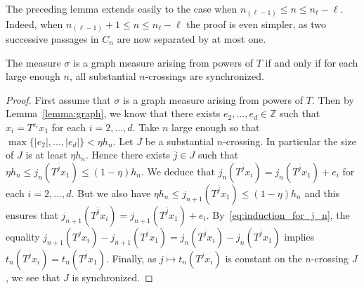 \documentclass[AHL,Unicode,longabstracts]{cedram}
\newcommand{\ZZ}{\mathbb{Z}}
\newcommand{\jb}{\overline{j}}
\begin{document}
\begin{rema}
The preceding lemma extends easily to the case when $n_{(\ell-1)}\le n\le n_\ell-\ell$. Indeed, when $n_{(\ell-1)}+1\le n\le n_\ell-\ell$ the proof is even simpler, as two successive passages in $C_n$ are now separated by at most one.
\end{rema}

\begin{prop}\label{prop:synchronized}
The measure $\sigma$ is a graph measure arising from powers of $T$ if and only if for each large enough $n$, all substantial $n$-crossings are synchronized.
\end{prop}

\begin{proof}
First assume that $\sigma$ is a graph measure arising from powers of $T$. Then by Lemma~\ref{lemma:graph}, we know that there exists $e_2,\ldots,e_d\in\ZZ$ such that $x_i=T^{e_i}x_1$ for each $i=2,\ldots,d$. Take $n$ large enough so that $\max\{|e_2|,\ldots,|e_d|\}<\eta h_n$. Let $J$ be a substantial $n$-crossing. In particular the size of $J$ is at least $\eta h_n$. Hence there exists $\jb\in J$ such that $\eta h_n\le j_n(T^{\jb} x_1) \le (1-\eta)h_n$. We deduce that $j_n(T^{\jb} x_i)= j_n(T^{\jb} x_1)+e_i$ for each $i=2,\ldots,d$. But we also have $\eta h_n\le j_{n+1}(T^{\jb} x_1) \le (1-\eta)h_n$ and this ensures that $j_{n+1}(T^{\jb} x_i)= j_{n+1}(T^{\jb} x_1)+e_i$. By~\eqref{eq:induction_for_j_n}, the equality $j_{n+1}(T^{\jb} x_i) - j_{n+1}(T^{\jb} x_1) = j_{n}(T^{\jb} x_i) - j_{n}(T^{\jb} x_1)$ implies $t_n(T^{\jb} x_i)=t_n(T^{\jb} x_1)$. Finally, as $j\mapsto t_n(T^jx_i)$ is constant on the $n$-crossing $J$, we see that $J$ is synchronized.


\end{proof}
\end{document}

